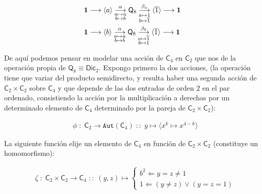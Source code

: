 \documentclass[12pt,a4paper,fleqn,spanish,final,openright]{extbook}
\theoremstyle{definition}
\theoremstyle{remark}
\begin{document}
\begin{center}
\begin{align*}
& \bold{1}
   \longrightarrow
\langle a \rangle
\underset{{\substack{{a   \mapsto a}\\{b   \mapsto b}}}}{\overset{\alpha }{   \longrightarrow   }}
\mathsf{Q}_{8}
\underset{{\substack{{a   \mapsto 1}\\{b   \mapsto \overline{1}}}}}{\overset{\beta_a }{   \longrightarrow   }}
\langle \overline{1} \rangle
   \longrightarrow
\bold{1}\\
& \bold{1}
   \longrightarrow
\langle b \rangle
\underset{{\substack{{a   \mapsto a}\\{b   \mapsto b}}}}{\overset{\alpha }{   \longrightarrow   }}
\mathsf{Q}_{8}
\underset{{\substack{{a   \mapsto \overline{1}}\\{b   \mapsto 1}}}}{\overset{\beta_b }{   \longrightarrow   }}
\langle \overline{1} \rangle
   \longrightarrow
\bold{1}
\end{align*}
\end{center}


	De aquí podemos pensar en modelar una acción de $\mathsf{C}_{4}$ en $\mathsf{C}_{2}$ que nos de la operación propia de $\mathsf{Q}_{8}   \equiv   \mathsf{Dic}_{2}$. Expongo primero la dos acciones, (la operación tiene que variar del producto semidirecto, y resulta haber una segunda acción de $\mathsf{C}_{2}    \times    \mathsf{C}_{2}$ sobre $\mathsf{C}_{4}$ y que depende de las dos entradas de orden $2$ en el par ordenado, consistiendo la acción por la multiplicación a derechas por un determinado elemento de $\mathsf{C}_{4}$ determinado por la pareja de ${\mathsf{C}_{2}}{   \times   }{\mathsf{C}_{2}}$):

\begin{align*}
&\phi \;:\;\mathsf{C}_{2}    \longrightarrow    \mathtt{Aut}⁡\left(\mathsf{C}_{4}\right)\; ::\; y    \mapsto \langle x^k   \mapsto x^{4-k}\rangle
\end{align*}

	La siguiente función elije un elemento de $\mathsf{C}_{4}$ en función de $\mathsf{C}_{2}   \times   \mathsf{C}_{2}$ (constituye un homomorfismo):

\begin{align*}
&\zeta \;:\;
{{{\mathsf{C}}_{2}}{   \times   }{{\mathsf{C}}_{2}}}
   \longrightarrow
{{\mathsf{C}}_{4}}\;::\;\left(y,z\right) \mapsto
\begin{cases}
b^2    \Leftarrow    {y=z   \neq    1}\\
1    \Leftarrow    (y   \neq    z)   \vee (y=z=1)
\end{cases}
\end{align*}
\end{document}
